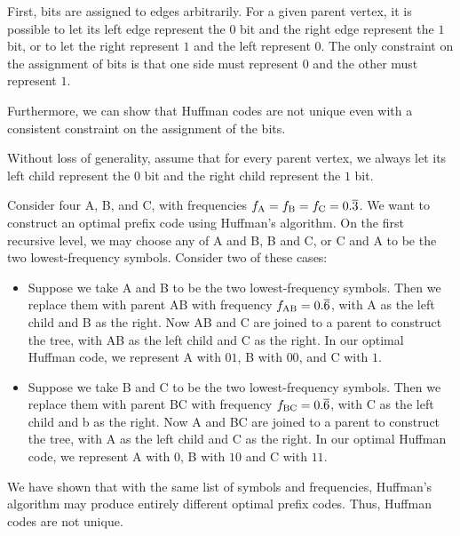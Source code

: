 \begin{enumerate}
\begin{solution}
First, bits are assigned to edges arbitrarily. For a given parent vertex, it is possible to let its left edge represent the $0$ bit and the right edge represent the $1$ bit, or to let the right represent $1$ and the left represent $0$. The only constraint on the assignment of bits is that one side must represent $0$ and the other must represent $1$. 

Furthermore, we can show that Huffman codes are not unique even with a consistent constraint on the assignment of the bits. 

Without loss of generality, assume that for every parent vertex, we always let its left child represent the $0$ bit and the right child represent the $1$ bit.

Consider four A, B, and C, with frequencies $f_{\rm A}=f_{\rm B}=f_{\rm C}=0.\overline{3}$. We want to construct an optimal prefix code using Huffman's algorithm. On the first recursive level, we may choose any of A and B, B and C, or C and A to be the two lowest-frequency symbols. Consider two of these cases:
\begin{itemize}
\item Suppose we take A and B to be the two lowest-frequency symbols. Then we replace them with parent AB with frequency $f_{\rm AB}=0.\overline{6}$, with A as the left child and B as the right. Now AB and C are joined to a parent to construct the tree, with AB as the left child and C as the right. In our optimal Huffman code, we represent A with $01$, B with $00$, and C with $1$.

\item Suppose we take B and C to be the two lowest-frequency symbols. Then we replace them with parent BC with frequency $f_{\rm BC}=0.\overline{6}$, with C as the left child and b as the right. Now A and BC are joined to a parent to construct the tree, with A as the left child and C as the right. In our optimal Huffman code, we represent A with $0$, B with $10$ and C with $11$.
\end{itemize}
We have shown that with the same list of symbols and frequencies, Huffman's algorithm may produce entirely different optimal prefix codes. Thus, Huffman codes are not unique.
\end{solution}
\end{enumerate}
\newpage
